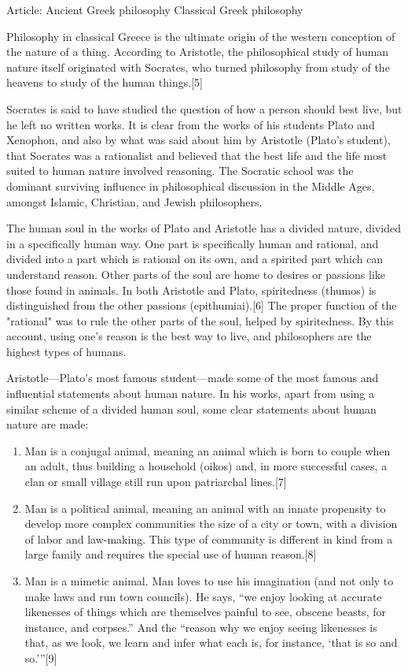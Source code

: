 Article: Ancient Greek philosophy Classical Greek philosophy

Philosophy in classical Greece is the ultimate origin of the western conception of the nature of a thing. According to Aristotle, the philosophical study of human nature itself originated with Socrates, who turned philosophy from study of the heavens to study of the human things.[5] 

Socrates is said to have studied the question of how a person should best live, but he left no written works. It is clear from the works of his students Plato and Xenophon, and also by what was said about him by Aristotle (Plato's student), that Socrates was a rationalist and believed that the best life and the life most suited to human nature involved reasoning. The Socratic school was the dominant surviving influence in philosophical discussion in the Middle Ages, amongst Islamic, Christian, and Jewish philosophers.

The human soul in the works of Plato and Aristotle has a divided nature, divided in a specifically human way. One part is specifically human and rational, and divided into a part which is rational on its own, and a spirited part which can understand reason. Other parts of the soul are home to desires or passions like those found in animals. In both Aristotle and Plato, spiritedness (thumos) is distinguished from the other passions (epithumiai).[6] The proper function of the "rational" was to rule the other parts of the soul, helped by spiritedness. By this account, using one's reason is the best way to live, and philosophers are the highest types of humans.

Aristotle—Plato's most famous student—made some of the most famous and influential statements about human nature. In his works, apart from using a similar scheme of a divided human soul, some clear statements about human nature are made:

\begin{enumerate}
\item Man is a conjugal animal, meaning an animal which is born to couple when an adult, thus building a household (oikos) and, in more successful cases, a clan or small village still run upon patriarchal lines.[7]
\item Man is a political animal, meaning an animal with an innate propensity to develop more complex communities the size of a city or town, with a division of labor and law-making. This type of community is different in kind from a large family and requires the special use of human reason.[8]
\item Man is a mimetic animal. Man loves to use his imagination (and not only to make laws and run town councils). He says, ``we enjoy looking at accurate likenesses of things which are themselves painful to see, obscene beasts, for instance, and corpses.'' And the ``reason why we enjoy seeing likenesses is that, as we look, we learn and infer what each is, for instance, `that is so and so.'''[9]
\end{enumerate}

